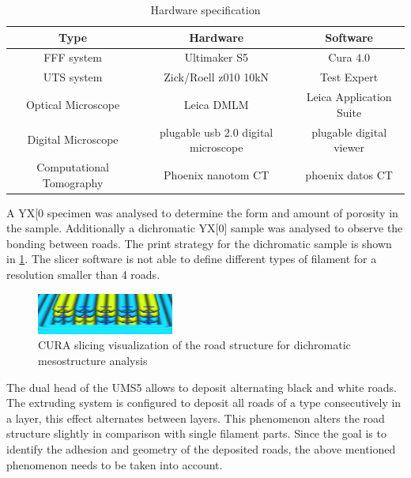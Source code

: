 \begin{table}[h]
	\centering
	\caption{Hardware specification}
	\label{tab:hardware}
	\begin{tabular}{ccc}
		Type  & Hardware & Software    \\
		\hline
		FFF system & Ultimaker S5 & Cura 4.0 \\
		UTS system & Zick/Roell z010 10kN & Test Expert \\
		Optical Microscope & Leica DMLM & Leica Application Suite \\		
        Digital Microscope & plugable usb 2.0 digital microscope & plugable digital viewer \\
		Computational Tomography & Phoenix nanotom CT  & phoenix datos CT \\

	

		\hline
	\end{tabular}
\end{table}

A YX[0 specimen was analysed to determine the form and amount of porosity in the sample. Additionally a dichromatic YX[0] sample was analysed to observe the bonding between roads. The print strategy for the dichromatic sample is shown in \ref{fig:colorroads}. The slicer software is not able to define different types of filament for a resolution smaller than 4 roads. 

\begin{figure}[H]
    \centering
    \includegraphics[width=0.4\textwidth]{chapter_4_RVE_Definition/figures/colorroads.PNG}
    \caption{CURA slicing visualization of the road structure for dichromatic mesostructure analysis}
    \label{fig:colorroads}
\end{figure}

The dual head of the UMS5  allows to deposit alternating black and white roads. The extruding system is configured to deposit all roads of a type consecutively in a layer, this effect alternates between layers. This phenomenon alters the road structure slightly in comparison with single filament parts. Since the goal is to identify the adhesion and geometry of the deposited roads, the above mentioned phenomenon needs to be taken into account.

